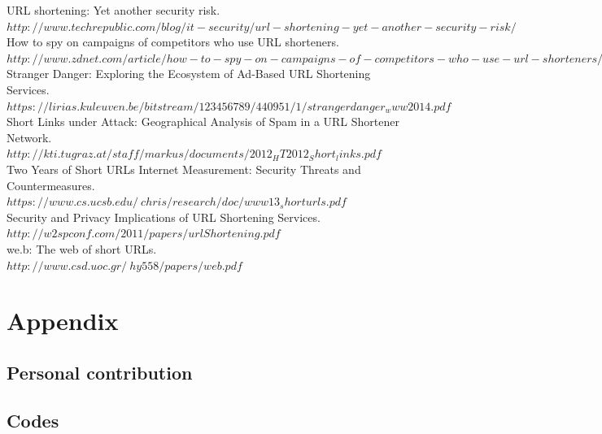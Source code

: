 \documentclass[12pt]{article}
\begin{document}
URL shortening: Yet another security risk.\\
$http://www.techrepublic.com/blog/it-security/url-shortening-yet-another-security-risk/$
\\

How to spy on campaigns of competitors who use URL shorteners.\\
$http://www.zdnet.com/article/how-to-spy-on-campaigns-of-competitors-who-use-url-shorteners/$
\\

Stranger Danger: Exploring the Ecosystem of Ad-Based URL Shortening Services.\\
$https://lirias.kuleuven.be/bitstream/123456789/440951/1/strangerdanger_www2014.pdf$
\\

Short Links under Attack: Geographical Analysis of Spam in a URL Shortener Network.\\
$http://kti.tugraz.at/staff/markus/documents/2012_HT2012_Short_links.pdf$
\\

Two Years of Short URLs Internet Measurement: Security Threats and Countermeasures.\\
$https://www.cs.ucsb.edu/~chris/research/doc/www13_shorturls.pdf$
\\

Security and Privacy Implications of URL Shortening Services.\\
$http://w2spconf.com/2011/papers/urlShortening.pdf$
\\

we.b: The web of short URLs.\\
$http://www.csd.uoc.gr/~hy558/papers/web.pdf$
\\

\section{Appendix}

\subsection{Personal contribution}

\subsection{Codes}
\end{document}
